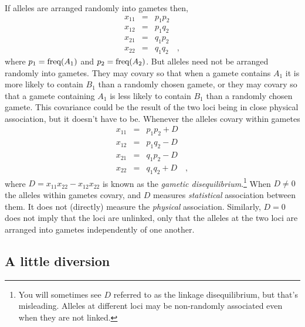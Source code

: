 If alleles are arranged randomly into gametes then,
\begin{eqnarray*}
x_{11} &=& p_1p_2 \\
x_{12} &=& p_1q_2 \\
x_{21} &=& q_1p_2 \\
x_{22} &=& q_1q_2 \quad ,
\end{eqnarray*}
where $p_1 = \hbox{freq}(A_1)$ and $p_2 = \hbox{freq}(A_2)$. But
alleles need not be arranged randomly into gametes. They may covary so
that when a gamete contains $A_1$ it is more likely to contain $B_1$
than a randomly chosen gamete, or they may covary so that a gamete
containing $A_1$ is less likely to contain $B_1$ than a randomly
chosen gamete. This covariance could be the result of the two loci
being in close physical association, but it doesn't have to
be. Whenever the alleles covary within gametes
\begin{eqnarray*}
x_{11} &=& p_1p_2 + D \\
x_{12} &=& p_1q_2 - D \\
x_{21} &=& q_1p_2 - D \\
x_{22} &=& q_1q_2 + D \quad ,
\end{eqnarray*}
where $D = x_{11}x_{22} - x_{12}x_{22}$ is known as the {\it gametic
  disequilibrium}.\footnote{You will sometimes see $D$ referred to as
  the linkage disequilibrium, but that's misleading. Alleles at
  different loci may be non-randomly associated even when they are not
  linked.} When $D \ne 0$ the alleles within gametes covary, and $D$
measures {\it statistical\/} association between them. It does not
(directly) measure the {\it physical\/} association. Similarly, $D =
0$ does not imply that the loci are unlinked, only that the alleles at
the two loci are arranged into gametes independently of one
another.

\subsection*{A little diversion}

